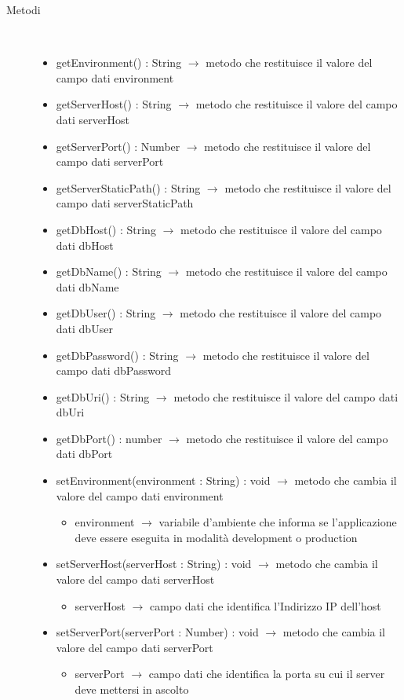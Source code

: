 \begin{description}
\item[Metodi] \hfill \\
\vspace{-7mm}
\begin{itemize}
	\item getEnvironment() : String $\rightarrow$ metodo che restituisce il valore del campo dati environment
	\item getServerHost() : String $\rightarrow$ metodo che restituisce il valore del campo dati serverHost
	\item getServerPort() : Number $\rightarrow$ metodo che restituisce il valore del campo dati serverPort
	\item getServerStaticPath() : String $\rightarrow$ metodo che restituisce il valore del campo dati serverStaticPath
	\item getDbHost() : String $\rightarrow$ metodo che restituisce il valore del campo dati dbHost
	\item getDbName() : String $\rightarrow$ metodo che restituisce il valore del campo dati dbName
	\item getDbUser() : String $\rightarrow$ metodo che restituisce il valore del campo dati dbUser
	\item getDbPassword() : String $\rightarrow$ metodo che restituisce il valore del campo dati dbPassword
	\item getDbUri() : String $\rightarrow$ metodo che restituisce il valore del campo dati dbUri
	\item getDbPort() : number $\rightarrow$ metodo che restituisce il valore del campo dati dbPort
	\item setEnvironment(environment : String) : void $\rightarrow$ metodo che cambia il valore del campo dati environment\begin{itemize}
		\item environment $\rightarrow$ variabile d'ambiente che informa se l'applicazione deve essere eseguita in modalità development o production
	\end{itemize}
	
	\item setServerHost(serverHost : String) : void $\rightarrow$ metodo che cambia il valore del campo dati serverHost\begin{itemize}
		\item serverHost $\rightarrow$ campo dati che identifica l'Indirizzo IP dell'host
	\end{itemize}
	
	\item setServerPort(serverPort : Number) : void $\rightarrow$ metodo che cambia il valore del campo dati serverPort\begin{itemize}
		\item serverPort $\rightarrow$ campo dati che identifica la porta su cui il server deve mettersi in ascolto
	\end{itemize}
	

\end{itemize}
\end{description}
